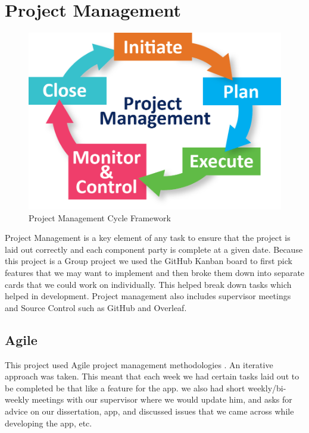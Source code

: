 \section{Project Management}
\begin{figure}[!htb]
    \centering
    \includegraphics[scale=0.45]{img/Project Management Cycle Framework V2.png}
    \caption{Project Management Cycle Framework}
    \label{fig:Project Management Cycle Framework}
\end{figure}
Project Management is a key element of any task to ensure that the project
is laid out correctly and each component party is complete at a given date.
Because this project is a Group project we used the GitHub Kanban board to first pick features that we may want to implement and then broke them down into
separate cards that we could work on individually. This helped break down tasks
which helped in development. Project management also includes supervisor meetings and Source Control such as GitHub and Overleaf.

\subsection{Agile}
This project used Agile project management methodologies \cite{WhatisAg86:online}. An iterative approach was taken. This meant that each week we had certain tasks laid out to
be completed be that like a feature for the app. we also had short weekly/bi-weekly meetings with our supervisor where we would update him,
and asks for advice on our dissertation, app, and discussed issues that we came across while developing the app, etc.

